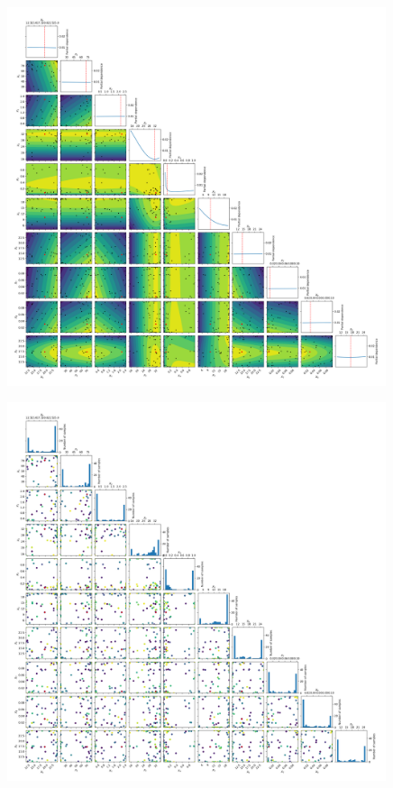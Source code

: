 \documentclass[11pt, a4paper]{article}
\begin{document}
\begin{figure}[H]
    \centering
    \includegraphics[width=0.99\textwidth]{images/LSC_skopt_objective.png}
\end{figure}

\begin{figure}[H]
    \centering
    \includegraphics[width=0.99\textwidth]{images/LSC_skopt_evals.png}
\end{figure}
\end{document}
